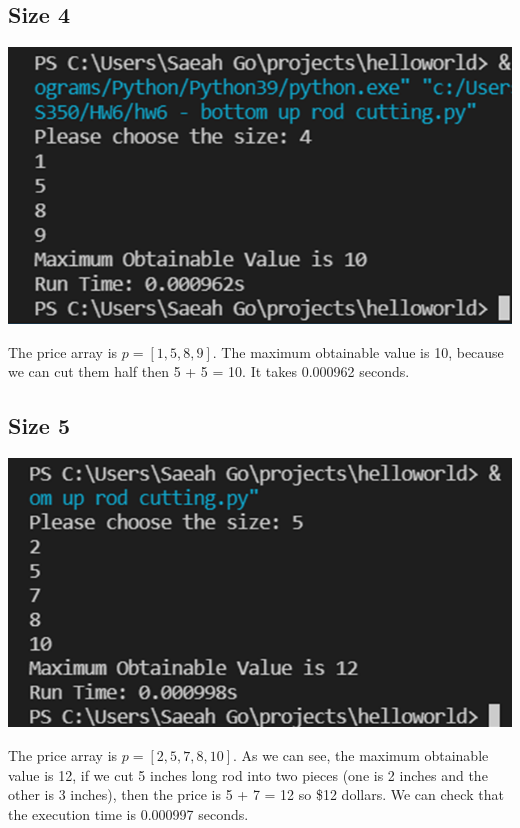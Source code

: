 \documentclass{article}
\begin{document}
\subsection{\textbf{Size 4}}
\begin{center}
\includegraphics[scale = 0.7]{size 4.png} \\
\end{center}
The price array is $p = [1, 5, 8, 9]$. The maximum obtainable value is 10, because we can cut them half then 5 + 5 = 10. It takes 0.000962 seconds. 

\subsection{\textbf{Size 5}}
\begin{center}
\includegraphics[scale = 0.7]{size 5.png} \\
\end{center}
The price array is $p = [2, 5, 7, 8, 10]$. As we can see, the maximum obtainable value is 12, if we cut 5 inches long rod into two pieces (one is 2 inches and the other is 3 inches), then the price is 5 + 7 = 12 so \$12 dollars. We can check that the execution time is 0.000997 seconds.
\end{document}

